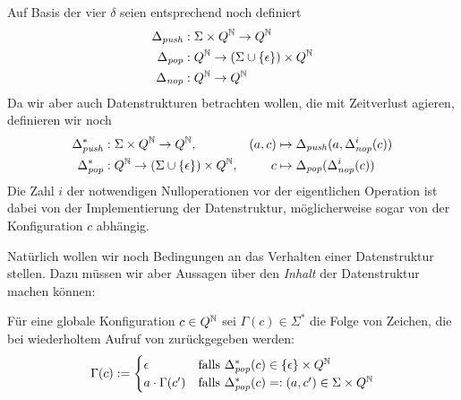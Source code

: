 \documentclass{article}
\begin{document}
Auf Basis der vier $\delta$ seien entsprechend noch definiert
\begin{align*}
    \Delta_{\mathit{push}} &: \Sigma \times Q^{\mathbb{N}} \rightarrow Q^{\mathbb{N}} \\
    \Delta_{\mathit{pop}} &: Q^{\mathbb{N}} \rightarrow (\Sigma \cup \{\epsilon\}) \times Q^{\mathbb{N}} \\
    \Delta_{\mathit{nop}} &: Q^{\mathbb{N}} \rightarrow Q^{\mathbb{N}}
\end{align*}
Da wir aber auch Datenstrukturen betrachten wollen, die mit Zeitverlust agieren, definieren wir noch
\begin{align*}
    \Delta^*_{\mathit{push}} &: \Sigma \times Q^{\mathbb{N}} \rightarrow Q^{\mathbb{N}},& (a,c) &\mapsto \Delta_{\mathit{push}}(a,\Delta^i_{\mathit{nop}}(c)) \\
    \Delta^*_{\mathit{pop}} &: Q^{\mathbb{N}} \rightarrow (\Sigma \cup \{\epsilon\}) \times Q^{\mathbb{N}},& c &\mapsto \Delta_{\mathit{pop}}(\Delta^i_{\mathit{nop}}(c))
\end{align*}
Die Zahl $i$ der notwendigen Nulloperationen vor der eigentlichen Operation ist dabei von der Implementierung der Datenstruktur, möglicherweise sogar von der Konfiguration $c$ abhängig.

Natürlich wollen wir noch Bedingungen an das Verhalten einer Datenstruktur stellen. Dazu müssen wir aber Aussagen über den \emph{Inhalt} der Datenstruktur machen können:
\begin{definition}
    Für eine globale Konfiguration $c \in Q^{\mathbb{N}}$ sei $\Gamma(c) \in \Sigma^*$ die Folge von Zeichen, die bei wiederholtem Aufruf von \pop zurückgegeben werden:
    \[ \Gamma(c) :=
        \begin{cases}
            \epsilon &\text{falls } \Delta^*_{\mathit{pop}}(c) \in \{\epsilon\} \times Q^{\mathbb{N}} \\
            a \cdot \Gamma(c') &\text{falls }\Delta^*_{\mathit{pop}}(c)=:(a,c') \in \Sigma \times Q^{\mathbb{N}}
    \end{cases} \]
\end{definition}
\end{document}
